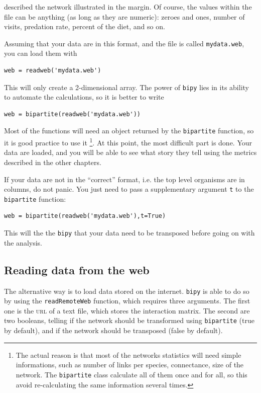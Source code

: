 \documentclass[nols,b5paper]{tufte-book}
\begin{document}
\noindent described the network illustrated in the margin. Of course, the values within the file can be anything (as long as they are numeric): zeroes and ones, number of visits, predation rate, percent of the diet, and so on.

Assuming that your data are in this format, and the file is called \texttt{mydata.web}, you can load them with

\begin{lstlisting}
web = readweb('mydata.web')
\end{lstlisting}

This will only create a 2-dimensional array. The power of \texttt{bipy} lies in its ability to automate the calculations, so it is better to write

\begin{lstlisting}
web = bipartite(readweb('mydata.web'))
\end{lstlisting}

Most of the functions will need an object returned by the \texttt{bipartite} function, so it is good practice to use it \footnote{The actual reason is that most of the networks statistics will need simple informations, such as number of links per species, connectance, size of the network. The \texttt{bipartite} class calculate all of them once and for all, so this avoid re-calculating the same information several times.}. At this point, the most difficult part is done. Your data are loaded, and you will be able to see what story they tell using the metrics described in the other chapters.

If your data are not in the ``correct'' format, i.e. the top level organisms are in columns, do not panic. You just need to pass a supplementary argument \texttt{t} to the \texttt{bipartite} function:

\begin{lstlisting}
web = bipartite(readweb('mydata.web'),t=True)
\end{lstlisting}

This will the the \texttt{bipy}	 that your data need to be transposed before going on with the analysis.

\subsection{Reading data from the web}

The alternative way is to load data stored on the internet. \texttt{bipy} is able to do so by using the \texttt{readRemoteWeb} function, which requires three arguments. The first one is the \textsc{url} of a text file, which stores the interaction matrix. The second are two booleans, telling if the network should be transformed using \texttt{bipartite} (true by default), and if the network should be transposed (false by default).
\end{document}
